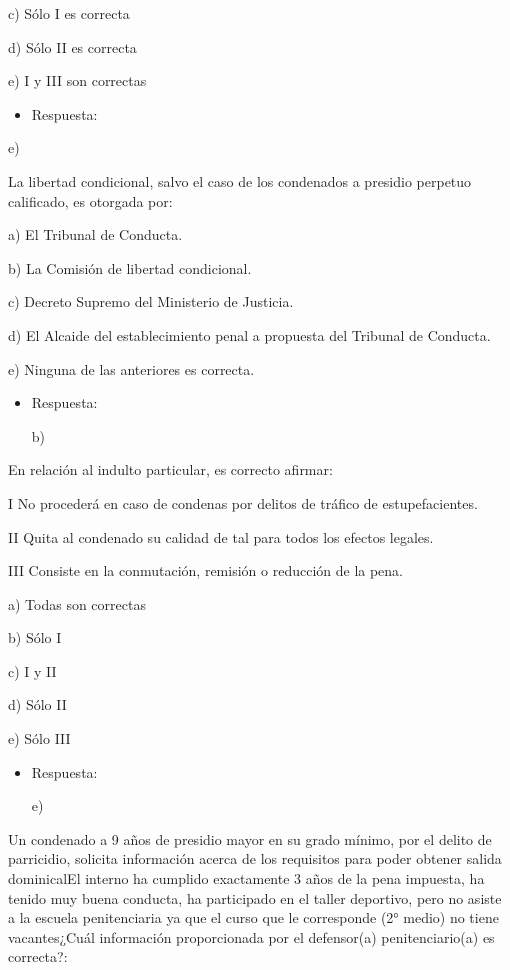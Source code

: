 \documentclass[letterpaper, 11pt]{article}
\begin{document}
c) Sólo I es correcta

d) Sólo II es correcta

e) I y III son correctas


\begin{itemize}
\item Respuesta:
\end{itemize}

e)



La libertad condicional, salvo el caso de los condenados a presidio
perpetuo calificado, es otorgada por:


a) El Tribunal de Conducta.


b) La Comisión de libertad condicional.


c) Decreto Supremo del Ministerio de Justicia.


d) El Alcaide del establecimiento penal a propuesta del Tribunal de
Conducta.


e) Ninguna de las anteriores es correcta.


\begin{itemize}
\item Respuesta:

b)
\end{itemize}


En relación al indulto particular, es correcto afirmar:

I No procederá en caso de condenas por delitos de tráfico de
estupefacientes.

II Quita al condenado su calidad de tal para todos los efectos
legales.

III Consiste en la conmutación, remisión o reducción de la pena.


a) Todas son correctas

b) Sólo I

c) I y II

d) Sólo II

e) Sólo III

\begin{itemize}
\item Respuesta:

e)
\end{itemize}


Un condenado a 9 años de presidio mayor en su grado mínimo, por el
delito de parricidio, solicita información acerca de los requisitos
para poder obtener salida dominicalEl interno ha cumplido exactamente
3 años de la pena impuesta, ha tenido muy buena conducta, ha
participado en el taller deportivo, pero no asiste a la escuela
penitenciaria ya que el curso que le corresponde (2° medio) no tiene
vacantes¿Cuál información proporcionada por el defensor(a)
penitenciario(a) es correcta?:
\end{document}
